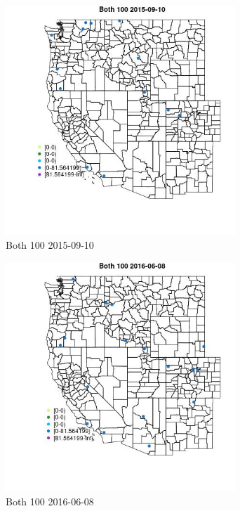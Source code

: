 \begin{figure} 
\centering  
\includegraphics[width=0.77\textwidth]{Code_Outputs/Report_ML_input_PM25_Step4_part_e_de_duplicated_aves_MapObsBoth_1002015-09-10.jpg} 
\caption{\label{fig:Report_ML_input_PM25_Step4_part_e_de_duplicated_avesMapObsBoth_1002015-09-10}Both 100 2015-09-10} 
\end{figure} 
 

\clearpage 

\begin{figure} 
\centering  
\includegraphics[width=0.77\textwidth]{Code_Outputs/Report_ML_input_PM25_Step4_part_e_de_duplicated_aves_MapObsBoth_1002016-06-08.jpg} 
\caption{\label{fig:Report_ML_input_PM25_Step4_part_e_de_duplicated_avesMapObsBoth_1002016-06-08}Both 100 2016-06-08} 
\end{figure} 
 

